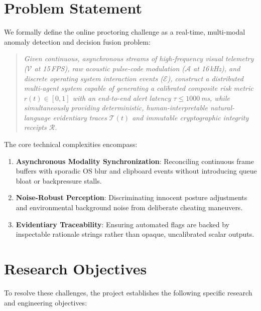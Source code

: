 \section{Problem Statement}

We formally define the online proctoring challenge as a real-time, multi-modal anomaly detection and decision fusion problem:

\begin{quote}
    \textit{Given continuous, asynchronous streams of high-frequency visual telemetry ($\mathcal{V}$ at 15\,FPS), raw acoustic pulse-code modulation ($\mathcal{A}$ at 16\,kHz), and discrete operating system interaction events ($\mathcal{E}$), construct a distributed multi-agent system capable of generating a calibrated composite risk metric $r(t) \in [0, 1]$ with an end-to-end alert latency $\tau \leq 1000$\,ms, while simultaneously providing deterministic, human-interpretable natural-language evidentiary traces $\mathcal{T}(t)$ and immutable cryptographic integrity receipts $\mathcal{R}$.}
\end{quote}

The core technical complexities encompass:
\begin{enumerate}
    \item \textbf{Asynchronous Modality Synchronization}: Reconciling continuous frame buffers with sporadic OS blur and clipboard events without introducing queue bloat or backpressure stalls.
    \item \textbf{Noise-Robust Perception}: Discriminating innocent posture adjustments and environmental background noise from deliberate cheating maneuvers.
    \item \textbf{Evidentiary Traceability}: Ensuring automated flags are backed by inspectable rationale strings rather than opaque, uncalibrated scalar outputs.
\end{enumerate}

\section{Research Objectives}

To resolve these challenges, the project establishes the following specific research and engineering objectives:

